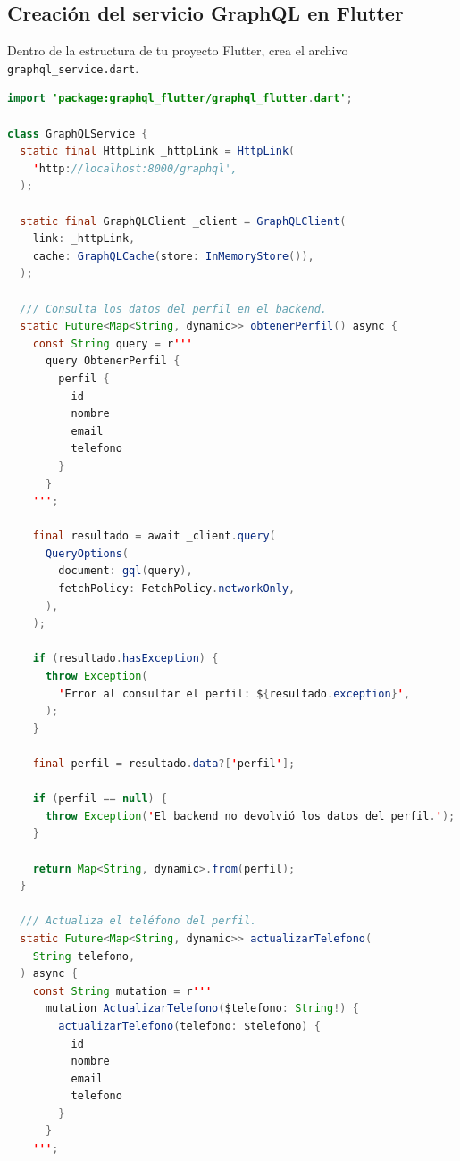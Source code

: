 
\subsection{Creación del servicio GraphQL en Flutter}
Dentro de la estructura de tu proyecto Flutter, crea el archivo \texttt{graphql\_service.dart}.

\begin{lstlisting}[language=Java, caption={graphql\_service.dart}]
import 'package:graphql_flutter/graphql_flutter.dart';

class GraphQLService {
  static final HttpLink _httpLink = HttpLink(
    'http://localhost:8000/graphql',
  );

  static final GraphQLClient _client = GraphQLClient(
    link: _httpLink,
    cache: GraphQLCache(store: InMemoryStore()),
  );

  /// Consulta los datos del perfil en el backend.
  static Future<Map<String, dynamic>> obtenerPerfil() async {
    const String query = r'''
      query ObtenerPerfil {
        perfil {
          id
          nombre
          email
          telefono
        }
      }
    ''';

    final resultado = await _client.query(
      QueryOptions(
        document: gql(query),
        fetchPolicy: FetchPolicy.networkOnly,
      ),
    );

    if (resultado.hasException) {
      throw Exception(
        'Error al consultar el perfil: ${resultado.exception}',
      );
    }

    final perfil = resultado.data?['perfil'];

    if (perfil == null) {
      throw Exception('El backend no devolvió los datos del perfil.');
    }

    return Map<String, dynamic>.from(perfil);
  }

  /// Actualiza el teléfono del perfil.
  static Future<Map<String, dynamic>> actualizarTelefono(
    String telefono,
  ) async {
    const String mutation = r'''
      mutation ActualizarTelefono($telefono: String!) {
        actualizarTelefono(telefono: $telefono) {
          id
          nombre
          email
          telefono
        }
      }
    ''';


\end{lstlisting}
